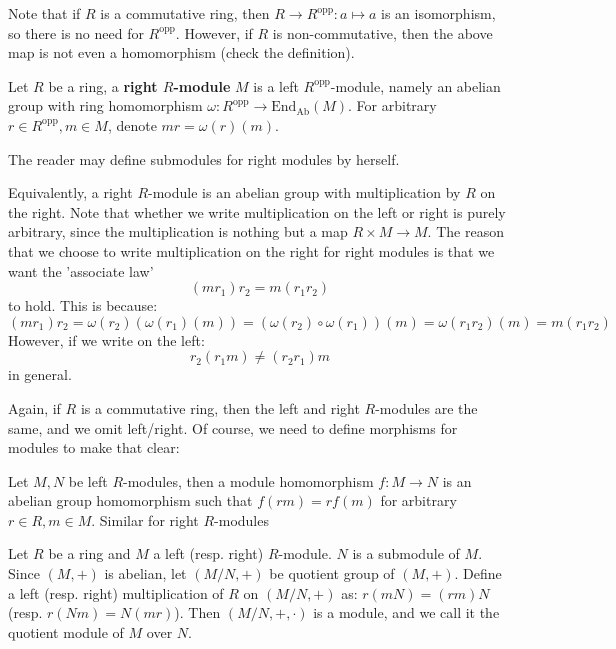\documentclass{note-eng}
\begin{document}
Note that if $R$ is a commutative ring, then $R \rightarrow R ^\mathrm{opp}: a \mapsto a$ is an isomorphism, so there is no need for $R ^\mathrm{opp}$. However, if $R$ is non-commutative, then the above map is not even a homomorphism (check the definition).

\begin{definition}
    Let $R$ be a ring, a \textbf{right $R$-module} $M$ is a left $R ^\mathrm{opp}$-module, namely an abelian group with ring homomorphism $\omega: R ^\mathrm{opp} \rightarrow \mathrm{End}_{\mathrm{Ab}}(M)$. For arbitrary $r \in R ^\mathrm{opp}, m \in M$, denote $mr = \omega(r)(m)$.
\end{definition}

The reader may define submodules for right modules by herself.

Equivalently, a right $R$-module is an abelian group with multiplication by $R$ on the right. Note that whether we write multiplication on the left or right is purely arbitrary, since the multiplication is nothing but a map $R \times M \rightarrow M$. The reason that we choose to write multiplication on the right for right modules is that we want the 'associate law'
$$(mr_1)r_2 = m(r_1r_2)$$
to hold. This is because:
$$(mr_1)r_2 = \omega(r_2)(\omega(r_1)(m)) = (\omega(r_2) \circ \omega(r_1))(m) = \omega(r_1r_2)(m) = m(r_1r_2)$$
However, if we write on the left:
$$r_2(r_1m) \ne (r_2r_1)m$$
in general.

Again, if $R$ is a commutative ring, then the left and right $R$-modules are the same, and we omit left/right. Of course, we need to define morphisms for modules to make that clear:

\begin{definition}
    Let $M, N$ be left $R$-modules, then a module homomorphism $f: M \rightarrow N$ is an abelian group homomorphism such that $f(rm) = rf(m)$ for arbitrary $r \in R, m \in M$. Similar for right $R$-modules
\end{definition}

\begin{definition}
    Let $R$ be a ring and $M$ a left (resp. right) $R$-module. $N$ is a submodule of $M$. Since $(M, +)$ is abelian, let $(M / N, +)$ be quotient group of $(M, +)$. Define a left (resp. right) multiplication of $R$ on $(M / N, +)$ as: $r(mN) = (rm)N$ (resp. $r(Nm) = N(mr)$). Then $(M / N, +, \cdot)$ is a module, and we call it the quotient module of $M$ over $N$.
\end{definition}
\end{document}

